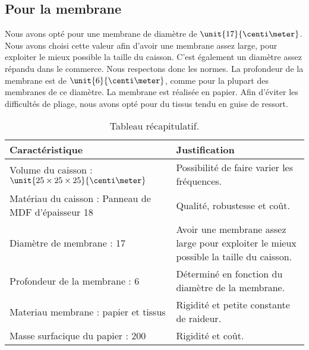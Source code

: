 \subsection{Pour la membrane}
Nous avons opté pour une membrane de diamètre de $\unit{17}{\centi\meter}$. Nous avons choisi cette valeur afin 
d'avoir une membrane assez large, pour exploiter le mieux possible la taille du caisson. C'est également un
diamètre assez répandu dans le commerce\cite{tlhp}. Nous respectons donc les normes.
La profondeur de la membrane est de $\unit{6}{\centi\meter}$, comme pour la plupart des membranes de ce
diamètre\cite{tlhp}. La membrane est réalisée en papier. Afin d'éviter les difficultés de pliage, nous avons opté pour
du tissus tendu en guise de ressort. 

\begin{table}[!htb]
	\centering
	\begin{tabularx}{\textwidth}{|X|X|}
		\hline
			 \textbf{Caractéristique} & \textbf{Justification} \\
		\hline
			Volume du caisson : $\unit{25\times25\times25}{\centi\meter}$ & Possibilité de faire varier les fréquences.  \\
		\hline
			Matériau du caisson : Panneau de 	MDF
			d'épaisseur \unit{18}{\milli\meter} & Qualité, robustesse et coût. \\
		\hline
			Diamètre de membrane : \unit{17}{\centi\meter} & Avoir une membrane assez large pour exploiter le mieux possible la taille du caisson. \\
		\hline
			Profondeur de la membrane : \unit{6}{\centi\meter} & Déterminé en fonction du diamètre de la membrane. \\
		\hline
			Materiau membrane : papier et tissus & Rigidité et petite constante de raideur. \\
		\hline
			Masse surfacique du papier : \unit{200}{\gram\per\meter\squared} & Rigidité et coût. \\
		\hline
	\end{tabularx}
	\caption{Tableau récapitulatif.}
\end{table}


